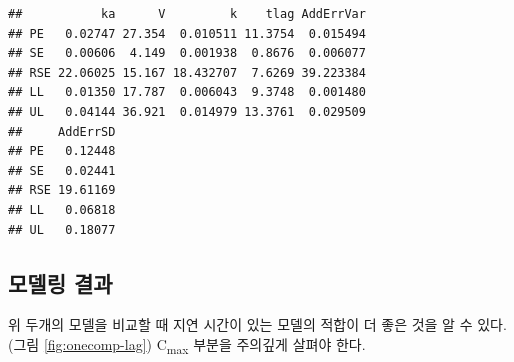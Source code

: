 \documentclass[
  11pt,
  krantz2, a4paper, twoside]{krantz}
\newenvironment{Shaded}{\begin{snugshade}}{\end{snugshade}}
\newcommand{\AttributeTok}[1]{\textcolor[rgb]{0.13,0.29,0.53}{#1}}
\newcommand{\DecValTok}[1]{\textcolor[rgb]{0.00,0.00,0.81}{#1}}
\newcommand{\FloatTok}[1]{\textcolor[rgb]{0.00,0.00,0.81}{#1}}
\newcommand{\FunctionTok}[1]{\textcolor[rgb]{0.13,0.29,0.53}{\textbf{#1}}}
\newcommand{\NormalTok}[1]{#1}
\newcommand{\OtherTok}[1]{\textcolor[rgb]{0.56,0.35,0.01}{#1}}
\newcommand{\SpecialCharTok}[1]{\textcolor[rgb]{0.81,0.36,0.00}{\textbf{#1}}}
\newcommand{\StringTok}[1]{\textcolor[rgb]{0.31,0.60,0.02}{#1}}
\theoremstyle{definition}
\theoremstyle{definition}
\theoremstyle{definition}
\theoremstyle{definition}
\theoremstyle{remark}
\begin{document}
\begin{verbatim}
##           ka      V         k    tlag AddErrVar
## PE   0.02747 27.354  0.010511 11.3754  0.015494
## SE   0.00606  4.149  0.001938  0.8676  0.006077
## RSE 22.06025 15.167 18.432707  7.6269 39.223384
## LL   0.01350 17.787  0.006043  9.3748  0.001480
## UL   0.04144 36.921  0.014979 13.3761  0.029509
##     AddErrSD
## PE   0.12448
## SE   0.02441
## RSE 19.61169
## LL   0.06818
## UL   0.18077
\end{verbatim}

\normalsize

\subsection{모델링 결과}\label{uxbaa8uxb378uxb9c1-uxacb0uxacfc}

위 두개의 모델을 비교할 때 지연 시간이 있는 모델의 적합이 더 좋은 것을 알 수 있다. (그림 \ref{fig:onecomp-lag}) C\textsubscript{max} 부분을 주의깊게 살펴야 한다. 

\begin{Shaded}
\end{Shaded}
\end{document}
